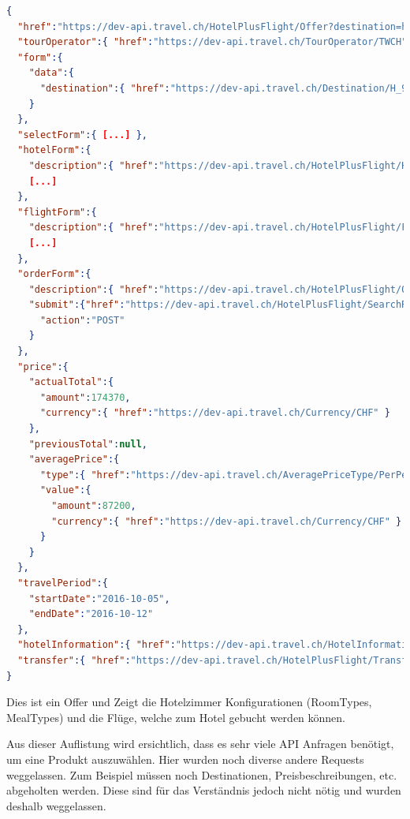 \begin{lstlisting}[language=json,firstnumber=1]
{
  "href":"https://dev-api.travel.ch/HotelPlusFlight/Offer?destination=https%3A%2F%2Fdev-api.travel.ch%2FDestination%2FH_9675C54E32056B7DC2393EE1D758FEB9&offerHotelInformation=https%3A%2F%2Fdev-api.travel.ch%2FHotelInformation%2F46FFEA61-6A24-4FCB-AE6A-524CE6E752DF[...]",
  "tourOperator":{ "href":"https://dev-api.travel.ch/TourOperator/TWCH" },
  "form":{
    "data":{
      "destination":{ "href":"https://dev-api.travel.ch/Destination/H_9675C54E32056B7DC2393EE1D758FEB9" }
    }
  },
  "selectForm":{ [...] },
  "hotelForm":{
    "description":{ "href":"https://dev-api.travel.ch/HotelPlusFlight/HotelConfigurationFormDescription?offerHotelInformation=https%3A%2F%2Fdev-api.travel.ch%2FHotelInformation%2F46FFEA61-6A24-4FCB-AE6A-524CE6E752DF[...]" },
    [...]
  },
  "flightForm":{
    "description":{ "href":"https://dev-api.travel.ch/HotelPlusFlight/FlightConfigurationFormDescription?offerHotelInformation=https%3A%2F%2Fdev-api.travel.ch%2FHotelInformation%2F46FFEA61-6A24-4FCB-AE6A-524CE6E752DF&roomOccupancies%5B0%5D.dateOfBirths%5B0%5D=null[...]" },
    [...]
  },
  "orderForm":{
    "description":{ "href":"https://dev-api.travel.ch/HotelPlusFlight/OrderFormDescription" },
    "submit":{"href":"https://dev-api.travel.ch/HotelPlusFlight/SearchResult/Offer/Order?destination=https%3A%2F%2Fdev-api.travel.ch%2FDestination%2FH_9675C54E32056B7DC2393EE1D758FEB9&offerHotelInformation=https%3A%2F%2Fdev-api.travel.ch%2FHotelInformation%2F46FFEA61-6A24-4FCB-AE6A-524CE6E752DF[...]",
      "action":"POST"
    }
  },
  "price":{
    "actualTotal":{
      "amount":174370,
      "currency":{ "href":"https://dev-api.travel.ch/Currency/CHF" }
    },
    "previousTotal":null,
    "averagePrice":{
      "type":{ "href":"https://dev-api.travel.ch/AveragePriceType/PerPerson" },
      "value":{
        "amount":87200,
        "currency":{ "href":"https://dev-api.travel.ch/Currency/CHF" }
      }
    }
  },
  "travelPeriod":{
    "startDate":"2016-10-05",
    "endDate":"2016-10-12"
  },
  "hotelInformation":{ "href":"https://dev-api.travel.ch/HotelInformation/46FFEA61-6A24-4FCB-AE6A-524CE6E752DF" },
  "transfer":{ "href":"https://dev-api.travel.ch/HotelPlusFlight/Transfer/NotIncluded" }
}
\end{lstlisting}
Dies ist ein Offer und Zeigt die Hotelzimmer Konfigurationen (RoomTypes, MealTypes) und die Flüge, welche zum Hotel gebucht werden können.

Aus dieser Auflistung wird ersichtlich, dass es sehr viele API Anfragen benötigt, um eine Produkt auszuwählen. Hier wurden noch diverse andere Requests weggelassen. Zum Beispiel müssen noch Destinationen, Preisbeschreibungen, etc. abgeholten werden. Diese sind für das Verständnis jedoch nicht nötig und wurden deshalb weggelassen.

